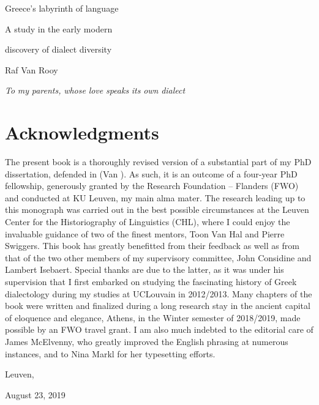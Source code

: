 

Greece’s labyrinth of language

A study in the early modern

discovery of dialect diversity

Raf Van Rooy

\textit{To} \textit{my} \textit{parents,} \textit{whose} \textit{love} \textit{speaks} \textit{its} \textit{own} \textit{dialect}

\section{}
\hypertarget{Toc19704798}{}\setcounter{tocdepth}{3}
\renewcommand\contentsname{}
\tableofcontents

\section{Acknowledgments}
\hypertarget{Toc19704799}{}
The present book is a thoroughly revised version of a substantial part of my PhD dissertation, defended in \citealt{May2017} (Van \citealt{Rooy2017}). As such, it is an outcome of a four-year PhD fellowship, generously granted by the Research Foundation – Flanders (FWO) and conducted at KU Leuven, my main alma mater. The research leading up to this monograph was carried out in the best possible circumstances at the Leuven Center for the Historiography of Linguistics (CHL), where I could enjoy the invaluable guidance of two of the finest mentors, Toon Van Hal and Pierre Swiggers. This book has greatly benefitted from their feedback as well as from that of the two other members of my supervisory committee, John Considine and Lambert Isebaert. Special thanks are due to the latter, as it was under his supervision that I first embarked on studying the fascinating history of Greek dialectology during my studies at UCLouvain in 2012/2013. Many chapters of the book were written and finalized during a long research stay in the ancient capital of eloquence and elegance, Athens, in the Winter semester of 2018/2019, made possible by an FWO travel grant. I am also much indebted to the editorial care of James McElvenny, who greatly improved the English phrasing at numerous instances, and to Nina Markl for her typesetting efforts.

Leuven,

August 23, 2019

